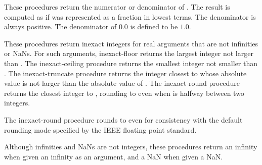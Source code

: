 \begin{entry}{%
}

These procedures return the numerator or denominator of 
.  The result is computed as if  was represented
as a fraction in lowest terms.  The denominator is always positive.
The denominator of $0.0$ is defined to be $1.0$.
\end{entry}

\begin{entry}{%
}

These procedures return inexact integers for real arguments that are
not infinities or NaNs.  For such arguments, {\cf inexact-floor}
returns the largest integer not larger than .  The {\cf
  inexact-ceiling} procedure returns the smallest integer not smaller than
.  The {\cf inexact-truncate} procedure returns the integer closest to
 whose absolute value is not larger than the absolute value of
.  The {\cf inexact-round} procedure returns the closest integer to
, rounding to even when  is halfway between two
integers.

\begin{rationale}
The {\cf inexact-round} procedure rounds to even for consistency with the default rounding
mode specified by the IEEE floating point standard.
\end{rationale}

Although infinities and NaNs are not integers, these procedures return
an infinity when given an infinity as an argument, and a NaN when
given a NaN.
\end{entry}

